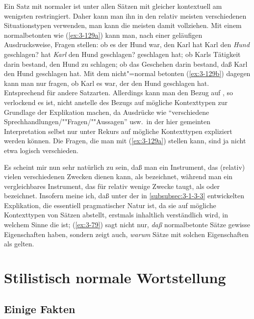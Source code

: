 \documentclass[output=paper]{langsci/langscibook}
\begin{document}
Ein Satz mit normaler  ist unter allen Sätzen mit gleicher
 kontextuell am wenigsten restringiert. Daher kann man ihn in
den relativ meisten verschiedenen Situationstypen verwenden, man kann
die meisten  damit
vollziehen. Mit einem normalbetonten  wie (\ref{ex:3-129a}) \zb kann
man, nach einer geläufigen Ausdrucksweise, 
Fragen stellen: ob es der Hund war, den Karl
\eal
\label{ex:3-129}
\ex
\label{ex:3-129a}
hat Karl den \textit{Hund} geschlagen?
\ex
\label{ex:3-129b}
hat \textit{Karl} den Hund geschlagen?
\zl
geschlagen hat; ob Karls Tätigkeit darin bestand, den Hund zu
schlagen; ob das Geschehen darin bestand, daß Karl den Hund geschlagen
hat. Mit dem nicht"=normal betonten  (\ref{ex:3-129b}) dagegen kann man
nur fragen, ob Karl es war, der den Hund geschlagen hat. Entsprechend
für andere Satzarten. Allerdings kann man den Bezug auf
, so verlockend es ist,
nicht anstelle des Bezugs auf mögliche Kontexttypen zur Grundlage der
Explikation machen, da Ausdrücke wie "`verschiedene
Sprechhandlungen/""Fragen/""Aussagen"' usw.\ in der hier gemeinten
Interpretation selbst nur unter Rekurs auf mögliche Kontexttypen
expliziert werden können. Die  Fragen, die man
mit (\ref{ex:3-129a}) stellen kann, sind ja nicht etwa logisch verschieden.

Es scheint mir nun sehr natürlich zu sein, daß man ein Instrument, das (relativ) vielen verschiedenen Zwecken dienen kann, als  bezeichnet, während man ein vergleichbares Instrument, das für relativ wenige Zwecke taugt, als  oder  bezeichnet. Insofern meine ich, daß unter der in \ref{subsubsec:3-1-3-3} entwickelten Explikation, die essentiell pragmatischer Natur ist, da sie auf mögliche Kontexttypen von Sätzen abstellt, erstmals inhaltlich verständlich wird, in welchem Sinne die   ist; (\ref{ex:3-79}) sagt nicht nur, \textit{daß} normalbetonte Sätze gewisse Eigenschaften haben, sondern zeigt auch, \textit{warum} Sätze mit
solchen Eigenschaften als  gelten.

\section{Stilistisch normale Wortstellung}
\label{sec:3-2}

\subsection{Einige Fakten}
\label{subsec:3-2-1}
\end{document}
